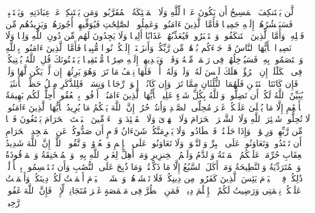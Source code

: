 \stopbuffer
\startbuffer[\q:4:172]
لَّن یَسۡتَنكِفَ ٱلۡمَسِیحُ أَن یَكُونَ عَبۡدࣰا لِّلَّهِ وَلَا ٱلۡمَلَٰۤئِكَةُ ٱلۡمُقَرَّبُونَۚ وَمَن یَسۡتَنكِفۡ عَنۡ عِبَادَتِهِۦ وَیَسۡتَكۡبِرۡ فَسَیَحۡشُرُهُمۡ إِلَیۡهِ جَمِیعࣰا%
\stopbuffer
\startbuffer[\q:4:173]
فَأَمَّا ٱلَّذِینَ ءَامَنُوا۟ وَعَمِلُوا۟ ٱلصَّٰلِحَٰتِ فَیُوَفِّیهِمۡ أُجُورَهُمۡ وَیَزِیدُهُم مِّن فَضۡلِهِۦۖ وَأَمَّا ٱلَّذِینَ ٱسۡتَنكَفُوا۟ وَٱسۡتَكۡبَرُوا۟ فَیُعَذِّبُهُمۡ عَذَابًا أَلِیمࣰا وَلَا یَجِدُونَ لَهُم مِّن دُونِ ٱللَّهِ وَلِیࣰّا وَلَا نَصِیرࣰا%
\stopbuffer
\startbuffer[\q:4:174]
یَٰۤأَیُّهَا ٱلنَّاسُ قَدۡ جَاۤءَكُم بُرۡهَٰنࣱ مِّن رَّبِّكُمۡ وَأَنزَلۡنَاۤ إِلَیۡكُمۡ نُورࣰا مُّبِینࣰا%
\stopbuffer
\startbuffer[\q:4:175]
فَأَمَّا ٱلَّذِینَ ءَامَنُوا۟ بِٱللَّهِ وَٱعۡتَصَمُوا۟ بِهِۦ فَسَیُدۡخِلُهُمۡ فِی رَحۡمَةࣲ مِّنۡهُ وَفَضۡلࣲ وَیَهۡدِیهِمۡ إِلَیۡهِ صِرَٰطࣰا مُّسۡتَقِیمࣰا%
\stopbuffer
\startbuffer[\q:4:176]
یَسۡتَفۡتُونَكَ قُلِ ٱللَّهُ یُفۡتِیكُمۡ فِی ٱلۡكَلَٰلَةِۚ إِنِ ٱمۡرُؤٌا۟ هَلَكَ لَیۡسَ لَهُۥ وَلَدࣱ وَلَهُۥۤ أُخۡتࣱ فَلَهَا نِصۡفُ مَا تَرَكَۚ وَهُوَ یَرِثُهَاۤ إِن لَّمۡ یَكُن لَّهَا وَلَدࣱۚ فَإِن كَانَتَا ٱثۡنَتَیۡنِ فَلَهُمَا ٱلثُّلُثَانِ مِمَّا تَرَكَۚ وَإِن كَانُوۤا۟ إِخۡوَةࣰ رِّجَالࣰا وَنِسَاۤءࣰ فَلِلذَّكَرِ مِثۡلُ حَظِّ ٱلۡأُنثَیَیۡنِۗ یُبَیِّنُ ٱللَّهُ لَكُمۡ أَن تَضِلُّوا۟ۗ وَٱللَّهُ بِكُلِّ شَیۡءٍ عَلِیمُۢ%
\stopbuffer
\startbuffer[\q:5:1]
یَٰۤأَیُّهَا ٱلَّذِینَ ءَامَنُوۤا۟ أَوۡفُوا۟ بِٱلۡعُقُودِۚ أُحِلَّتۡ لَكُم بَهِیمَةُ ٱلۡأَنۡعَٰمِ إِلَّا مَا یُتۡلَىٰ عَلَیۡكُمۡ غَیۡرَ مُحِلِّی ٱلصَّیۡدِ وَأَنتُمۡ حُرُمٌۗ إِنَّ ٱللَّهَ یَحۡكُمُ مَا یُرِیدُ%
\stopbuffer
\startbuffer[\q:5:2]
یَٰۤأَیُّهَا ٱلَّذِینَ ءَامَنُوا۟ لَا تُحِلُّوا۟ شَعَٰۤئِرَ ٱللَّهِ وَلَا ٱلشَّهۡرَ ٱلۡحَرَامَ وَلَا ٱلۡهَدۡیَ وَلَا ٱلۡقَلَٰۤئِدَ وَلَاۤ ءَاۤمِّینَ ٱلۡبَیۡتَ ٱلۡحَرَامَ یَبۡتَغُونَ فَضۡلࣰا مِّن رَّبِّهِمۡ وَرِضۡوَٰنࣰاۚ وَإِذَا حَلَلۡتُمۡ فَٱصۡطَادُوا۟ۚ وَلَا یَجۡرِمَنَّكُمۡ شَنَءَانُ قَوۡمٍ أَن صَدُّوكُمۡ عَنِ ٱلۡمَسۡجِدِ ٱلۡحَرَامِ أَن تَعۡتَدُوا۟ۘ وَتَعَاوَنُوا۟ عَلَى ٱلۡبِرِّ وَٱلتَّقۡوَىٰۖ وَلَا تَعَاوَنُوا۟ عَلَى ٱلۡإِثۡمِ وَٱلۡعُدۡوَٰنِۚ وَٱتَّقُوا۟ ٱللَّهَۖ إِنَّ ٱللَّهَ شَدِیدُ ٱلۡعِقَابِ%
\stopbuffer
\startbuffer[\q:5:3]
حُرِّمَتۡ عَلَیۡكُمُ ٱلۡمَیۡتَةُ وَٱلدَّمُ وَلَحۡمُ ٱلۡخِنزِیرِ وَمَاۤ أُهِلَّ لِغَیۡرِ ٱللَّهِ بِهِۦ وَٱلۡمُنۡخَنِقَةُ وَٱلۡمَوۡقُوذَةُ وَٱلۡمُتَرَدِّیَةُ وَٱلنَّطِیحَةُ وَمَاۤ أَكَلَ ٱلسَّبُعُ إِلَّا مَا ذَكَّیۡتُمۡ وَمَا ذُبِحَ عَلَى ٱلنُّصُبِ وَأَن تَسۡتَقۡسِمُوا۟ بِٱلۡأَزۡلَٰمِۚ ذَٰلِكُمۡ فِسۡقٌۗ ٱلۡیَوۡمَ یَئِسَ ٱلَّذِینَ كَفَرُوا۟ مِن دِینِكُمۡ فَلَا تَخۡشَوۡهُمۡ وَٱخۡشَوۡنِۚ ٱلۡیَوۡمَ أَكۡمَلۡتُ لَكُمۡ دِینَكُمۡ وَأَتۡمَمۡتُ عَلَیۡكُمۡ نِعۡمَتِی وَرَضِیتُ لَكُمُ ٱلۡإِسۡلَٰمَ دِینࣰاۚ فَمَنِ ٱضۡطُرَّ فِی مَخۡمَصَةٍ غَیۡرَ مُتَجَانِفࣲ لِّإِثۡمࣲ فَإِنَّ ٱللَّهَ غَفُورࣱ رَّحِیمࣱ%
